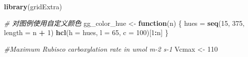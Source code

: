 \documentclass[
]{krantz}
\makeatletter
\newenvironment{Shaded}{\begin{snugshade}}{\end{snugshade}}
\newcommand{\CommentTok}[1]{\textcolor[rgb]{0.56,0.35,0.01}{\textit{#1}}}
\newcommand{\ControlFlowTok}[1]{\textcolor[rgb]{0.13,0.29,0.53}{\textbf{#1}}}
\newcommand{\DataTypeTok}[1]{\textcolor[rgb]{0.13,0.29,0.53}{#1}}
\newcommand{\DecValTok}[1]{\textcolor[rgb]{0.00,0.00,0.81}{#1}}
\newcommand{\KeywordTok}[1]{\textcolor[rgb]{0.13,0.29,0.53}{\textbf{#1}}}
\newcommand{\NormalTok}[1]{#1}
\newcommand{\OperatorTok}[1]{\textcolor[rgb]{0.81,0.36,0.00}{\textbf{#1}}}
\newcommand{\StringTok}[1]{\textcolor[rgb]{0.31,0.60,0.02}{#1}}
\newenvironment{kframe}{%
\medskip{}
\setlength{\fboxsep}{.8em}
 \def\at@end@of@kframe{}%
 \ifinner\ifhmode%
  \def\at@end@of@kframe{\end{minipage}}%
  \begin{minipage}{\columnwidth}%
 \fi\fi%
 \def\FrameCommand##1{\hskip\@totalleftmargin \hskip-\fboxsep
 \colorbox{shadecolor}{##1}\hskip-\fboxsep
     \hskip-\linewidth \hskip-\@totalleftmargin \hskip\columnwidth}%
 \MakeFramed {\advance\hsize-\width
   \@totalleftmargin\z@ \linewidth\hsize
   \@setminipage}}%
 {\par\unskip\endMakeFramed%
 \at@end@of@kframe}
\renewenvironment{Shaded}{\begin{kframe}}{\end{kframe}}
\makeatother
\begin{document}
\begin{Shaded}
\begin{Highlighting}[]
\KeywordTok{library}\NormalTok{(gridExtra)}

\CommentTok{# 对图例使用自定义颜色}
\NormalTok{gg_color_hue <-}\StringTok{ }\ControlFlowTok{function}\NormalTok{(n) \{}
\NormalTok{  hues =}\StringTok{ }\KeywordTok{seq}\NormalTok{(}\DecValTok{15}\NormalTok{, }\DecValTok{375}\NormalTok{, }\DataTypeTok{length =}\NormalTok{ n }\OperatorTok{+}\StringTok{ }\DecValTok{1}\NormalTok{)}
  \KeywordTok{hcl}\NormalTok{(}\DataTypeTok{h =}\NormalTok{ hues, }\DataTypeTok{l =} \DecValTok{65}\NormalTok{, }\DataTypeTok{c =} \DecValTok{100}\NormalTok{)[}\DecValTok{1}\OperatorTok{:}\NormalTok{n]}
\NormalTok{\}}

\CommentTok{#Maximum Rubisco carboxylation rate in umol m-2 s-1}
\NormalTok{Vcmax <-}\StringTok{ }\DecValTok{110}


\end{Highlighting}
\end{Shaded}
\end{document}
